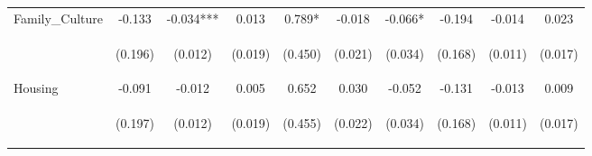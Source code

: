 \begin{tabular}{lccccccccc}
\noalign{\smallskip}Family_Culture & -0.133 & -0.034*** & 0.013 & 0.789* & -0.018 & -0.066* & -0.194 & -0.014 & 0.023\\
 & \begin{footnotesize}(0.196)\end{footnotesize} & \begin{footnotesize}(0.012)\end{footnotesize} & \begin{footnotesize}(0.019)\end{footnotesize} & \begin{footnotesize}(0.450)\end{footnotesize} & \begin{footnotesize}(0.021)\end{footnotesize} & \begin{footnotesize}(0.034)\end{footnotesize} & \begin{footnotesize}(0.168)\end{footnotesize} & \begin{footnotesize}(0.011)\end{footnotesize} & \begin{footnotesize}(0.017)\end{footnotesize}\\
\noalign{\smallskip}Housing & -0.091 & -0.012 & 0.005 & 0.652 & 0.030 & -0.052 & -0.131 & -0.013 & 0.009\\
 & \begin{footnotesize}(0.197)\end{footnotesize} & \begin{footnotesize}(0.012)\end{footnotesize} & \begin{footnotesize}(0.019)\end{footnotesize} & \begin{footnotesize}(0.455)\end{footnotesize} & \begin{footnotesize}(0.022)\end{footnotesize} & \begin{footnotesize}(0.034)\end{footnotesize} & \begin{footnotesize}(0.168)\end{footnotesize} & \begin{footnotesize}(0.011)\end{footnotesize} & \begin{footnotesize}(0.017)\end{footnotesize}\\

\end{tabular}
